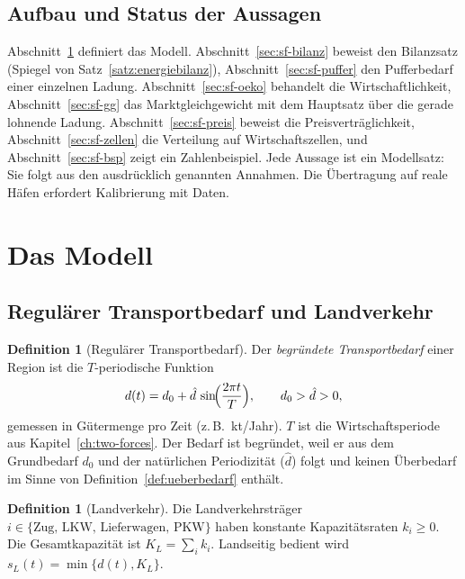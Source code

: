 \documentclass[a4paper, 12pt, twoside, openright]{report}
\providecommand{\dhat}{\hat d}      %
\theoremstyle{definition}
\newtheorem{definition}[theorem]{Definition}
\theoremstyle{definition}
\begin{document}
\subsection{Aufbau und Status der Aussagen}

Abschnitt~\ref{sec:sf-modell} definiert das Modell. Abschnitt~\ref{sec:sf-bilanz}
beweist den Bilanzsatz (Spiegel von Satz~\ref{satz:energiebilanz}),
Abschnitt~\ref{sec:sf-puffer} den Pufferbedarf einer einzelnen Ladung.
Abschnitt~\ref{sec:sf-oeko} behandelt die Wirtschaftlichkeit, Abschnitt~\ref{sec:sf-gg}
das Marktgleichgewicht mit dem Hauptsatz über die gerade lohnende Ladung.
Abschnitt~\ref{sec:sf-preis} beweist die Preisverträglichkeit,
Abschnitt~\ref{sec:sf-zellen} die Verteilung auf Wirtschaftszellen, und
Abschnitt~\ref{sec:sf-bsp} zeigt ein Zahlenbeispiel. Jede Aussage ist ein
Modellsatz: Sie folgt aus den ausdrücklich genannten Annahmen. Die Übertragung auf
reale Häfen erfordert Kalibrierung mit Daten.

\section{Das Modell}\label{sec:sf-modell}

\subsection{Regulärer Transportbedarf und Landverkehr}

\begin{definition}[Regulärer Transportbedarf]\label{def:sf-bedarf}
Der \emph{begründete Transportbedarf} einer Region ist die $T$-periodische Funktion
\begin{equation}
  d(t)=d_0+\dhat\,\sin\!\Bigl(\frac{2\pi t}{T}\Bigr),\qquad d_0>\dhat>0,
  \label{eq:sf-bedarf}
\end{equation}
gemessen in Gütermenge pro Zeit (z.\,B.\ kt/Jahr). $T$ ist die Wirtschaftsperiode
aus Kapitel~\ref{ch:two-forces}. Der Bedarf ist begründet, weil er aus dem
Grundbedarf $d_0$ und der natürlichen Periodizität ($\dhat$) folgt und keinen
Überbedarf im Sinne von Definition~\ref{def:ueberbedarf} enthält.
\end{definition}

\begin{definition}[Landverkehr]\label{def:sf-land}
Die Landverkehrsträger $i\in\{\text{Zug, LKW, Lieferwagen, PKW}\}$ haben konstante
Kapazitätsraten $k_i\ge 0$. Die Gesamtkapazität ist $K_L=\sum_i k_i$. Landseitig
bedient wird $s_L(t)=\min\{d(t),K_L\}$.
\end{definition}
\end{document}
